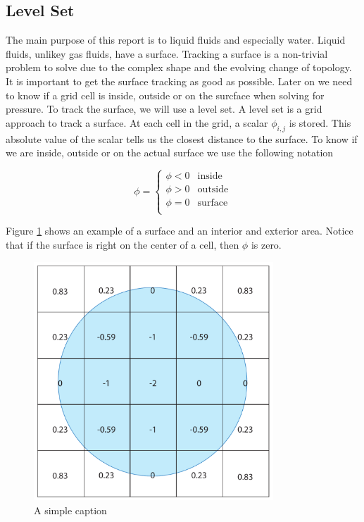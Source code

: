 \subsection{Level Set}

The main purpose of this report is to liquid fluids and especially water. Liquid fluids, unlikey gas fluids, have a surface. Tracking a surface is a non-trivial problem to solve due to the complex shape and the evolving change of topology. It is important to get the surface tracking as good as possible. Later on we need to know if a grid cell is inside, outside or on the surcface when solving for pressure. To track the surface, we will use a level set. A level set is a grid approach to track a surface. At each cell in the grid, a scalar $\phi_{i,j}$ is stored. This absolute value of the scalar tells us the closest distance to the surface. To know if we are inside, outside or on the actual surface we use the following notation

\begin{equation}
\phi = 
\left\{
\begin{array}{ll}
\phi < 0 & \mbox{inside}  \\
\phi > 0 & \mbox{outside} \\
\phi = 0 & \mbox{surface} \\
\end{array}
\right.
\end{equation}

Figure \ref{levetsetexample} shows an example of a surface and an interior and exterior area. Notice that if the surface is right on the center of a cell, then $\phi$ is zero. 

\begin{figure}[ht!]
\centering
\includegraphics[width=90mm]{img/levelset.pdf}
\caption{A simple caption}
\label{levetsetexample}
\end{figure}

